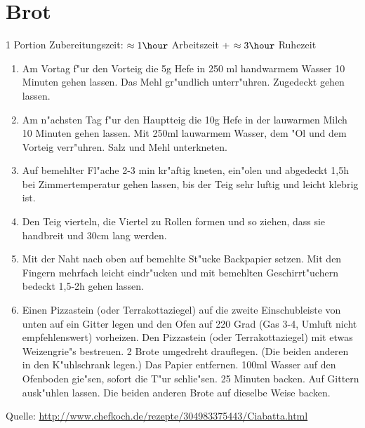 \chapter{Brot}
1 Portion \hfill Zubereitungszeit: $\approx1 \hour$ Arbeitszeit + $\approx3 \hour$ Ruhezeit
\begin{enumerate}
\item	Am Vortag f"ur den Vorteig die 5g Hefe in 250 ml handwarmem Wasser 10 Minuten gehen 		lassen. Das Mehl gr"undlich unterr"uhren. Zugedeckt gehen lassen.
\item   	Am n"achsten Tag f"ur den Hauptteig die 10g Hefe in der lauwarmen Milch 10 Minuten gehen lassen. Mit 250ml lauwarmem Wasser, dem "Ol und dem Vorteig verr"uhren. Salz und 		Mehl unterkneten.
\item
Auf bemehlter Fl"ache 2-3 min kr"aftig kneten, ein"olen und abgedeckt 1,5h bei Zimmertemperatur gehen lassen, bis der Teig sehr luftig und leicht klebrig ist.
\item
Den Teig vierteln, die Viertel zu Rollen formen und so ziehen, dass sie handbreit und 30cm lang werden.
\item
Mit der Naht nach oben auf bemehlte St"ucke Backpapier setzen. Mit den Fingern mehrfach leicht eindr"ucken und mit bemehlten Geschirrt"uchern bedeckt 1,5-2h gehen lassen.
\item
Einen Pizzastein (oder Terrakottaziegel) auf die zweite Einschubleiste von unten auf ein Gitter legen und den Ofen auf 220 Grad (Gas 3-4, Umluft nicht empfehlenswert) vorheizen. Den Pizzastein (oder Terrakottaziegel) mit etwas Weizengrie"s bestreuen. 2 Brote umgedreht drauflegen. (Die beiden anderen in den K"uhlschrank legen.) Das Papier entfernen. 100ml Wasser auf den Ofenboden gie"sen, sofort die T"ur schlie"sen. 25 Minuten backen. Auf Gittern ausk"uhlen lassen. Die beiden anderen Brote auf dieselbe Weise backen.
\end{enumerate}

Quelle: \url{http://www.chefkoch.de/rezepte/304983375443/Ciabatta.html}
